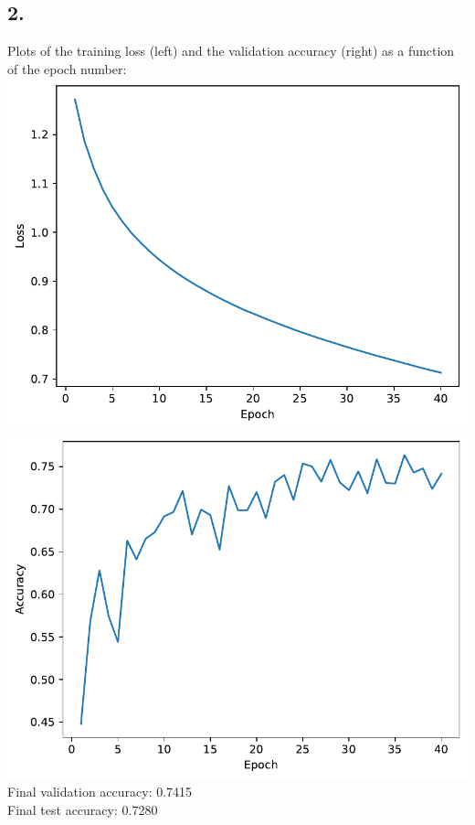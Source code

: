 \documentclass[12pt,a4paper]{article}
\begin{document}
    \subsection{2.}
        Plots of the training loss (left) and the validation accuracy (right) as a function of the epoch number: \\
        \includegraphics[width=\imagewidth]{q2/q2_2_lr-0.01-train-loss.pdf}
        \includegraphics[width=\imagewidth]{q2/q2_2_lr-0.01-valid-accuracy.pdf} \\
        Final validation accuracy: 0.7415 \\
        Final test accuracy: 0.7280

    \newpage
\end{document}
